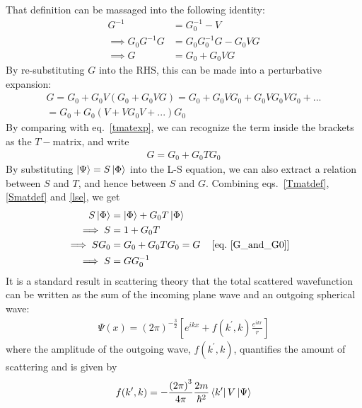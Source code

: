 \documentclass[twoside]{report}
\numberwithin{equation}{section}
\begin{document}
That definition can be massaged into the following identity:
\begin{equation}\begin{aligned}
	\label{GinVG}
	G^{-1} &= G_0^{-1} - V\\
	\implies G_0 G^{-1} G &= G_0 G_0^{-1} G - G_0 V G\\
	\implies G &= G_0 + G_0 V G
\end{aligned}\end{equation}
By re-substituting \(G\) into the RHS, this can be made into a perturbative expansion:
\begin{equation}\begin{aligned}
	G = G_0 + G_0 V \left(G_0 + G_0 V G\right) = G_0 + G_0 V G_0 + G_0 V G_0 V G_0 + ... \\
	= G_0 + G_0 \left( V + V G_0 V + ... \right) G_0
\end{aligned}\end{equation}
By comparing with eq.~\ref{tmatexp}, we can recognize the term inside the brackets as the \(T-\)matrix, and write
\begin{equation}\begin{aligned}
	G = G_0 + G_0 T G_0
	\label{G_and_G0}
\end{aligned}\end{equation}
By substituting \(\ket{\Psi} = S\ket{\Phi}\) into the L-S equation, we can also extract a relation between \(S\) and \(T\), and hence between \(S\) and \(G\). Combining eqs.~\ref{Tmatdef},\ref{Smatdef} and \ref{lse}, we get
\begin{align}
	S\ket{\Phi} &= \ket{\Phi} + G_0 T\ket{\Phi}\\
	\implies S &= 1 + G_0 T\\
	\implies SG_0 &= G_0 + G_0 T G_0 = G && \left[\text{eq.~\ref{G_and_G0}}\right]\\
	\implies S &= G  G_0^{-1} \label{SinG}
\end{align}
It is a standard result in scattering theory that the total scattered wavefunction can be written as the sum of the incoming plane wave and an outgoing spherical wave:
\begin{equation}\begin{aligned}
	\Psi(x) = \left(2\pi\right)^{-\frac{3}{2}}\left[e^{ikx} + f(k^\prime, k) \frac{e^{ikr}}{r}\right]
\end{aligned}\end{equation}
where the amplitude of the outgoing wave, \(f(k^\prime,k)\), quantifies the amount of scattering and is given by
\begin{equation}\begin{aligned}
	f(k^\prime, k) = - \frac{\left( 2\pi \right) ^3}{4\pi} \frac{2m}{\hbar^2}\bra{k^\prime}V\ket{\Psi}
\end{aligned}\end{equation}
\end{document}
